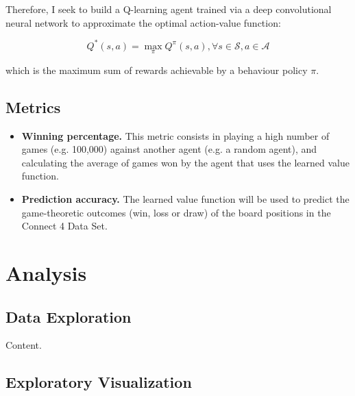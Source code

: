 \documentclass{article}
\begin{document}
Therefore, I seek to build a Q-learning agent trained via a deep convolutional neural network to
approximate the optimal action-value function:

\begin{equation}
Q^*(s,a) = \max\limits_\pi Q^\pi(s,a), \forall s \in \mathcal{S}, a \in \mathcal{A}
\end{equation}

\noindent which is the maximum sum of rewards achievable by a behaviour policy $\pi$.

\subsection{Metrics}

\begin{itemize}

    \item \textbf{Winning percentage.} This metric consists in playing a high number of games (e.g.
        100,000) against another agent (e.g. a random agent), and calculating the average of games
        won by the agent that uses the learned value function.
        
    \item \textbf{Prediction accuracy.} The learned value function will be used to predict the
        game-theoretic outcomes (win, loss or draw) of the board positions in the Connect 4 Data
        Set.

\end{itemize}

\section{Analysis}

\subsection{Data Exploration}

Content.

\subsection{Exploratory Visualization}
\end{document}
